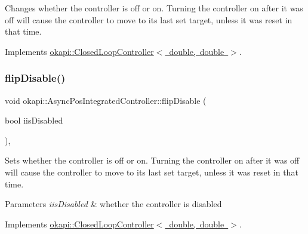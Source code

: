 Changes whether the controller is off or on. Turning the controller on after it was off will cause the controller to move to its last set target, unless it was reset in that time. 

Implements \mbox{\hyperlink{classokapi_1_1ClosedLoopController_a9de69b60885df41cd2164fe1a23f34d3}{okapi\+::\+Closed\+Loop\+Controller$<$ double, double $>$}}.

\mbox{\label{classokapi_1_1AsyncPosIntegratedController_a6476dde71ef77fceb1c461b4f0ebe62b}} 
\subsubsection{\texorpdfstring{flipDisable()}{flipDisable()}\hspace{0.1cm}{\footnotesize\ttfamily [2/2]}}
{\footnotesize\ttfamily void okapi\+::\+Async\+Pos\+Integrated\+Controller\+::flip\+Disable (\begin{DoxyParamCaption}\item[{bool}]{iis\+Disabled }\end{DoxyParamCaption})\hspace{0.3cm}{\ttfamily [override]}, {\ttfamily [virtual]}}

Sets whether the controller is off or on. Turning the controller on after it was off will cause the controller to move to its last set target, unless it was reset in that time.


\begin{DoxyParams}{Parameters}
{\em iis\+Disabled} & whether the controller is disabled \\
\hline
\end{DoxyParams}


Implements \mbox{\hyperlink{classokapi_1_1ClosedLoopController_a768cd1db40ce9cd5c89b20be6e838ccc}{okapi\+::\+Closed\+Loop\+Controller$<$ double, double $>$}}.

\mbox{\label{classokapi_1_1AsyncPosIntegratedController_a82aeb0cb2d1aab524b9a79a249260e11}} 
